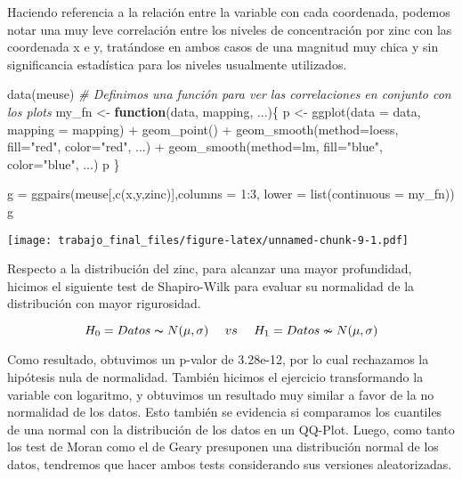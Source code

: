 \documentclass[
  12pt,
]{article}
\newenvironment{Shaded}{\begin{snugshade}}{\end{snugshade}}
\newcommand{\AttributeTok}[1]{\textcolor[rgb]{0.77,0.63,0.00}{#1}}
\newcommand{\CommentTok}[1]{\textcolor[rgb]{0.56,0.35,0.01}{\textit{#1}}}
\newcommand{\ControlFlowTok}[1]{\textcolor[rgb]{0.13,0.29,0.53}{\textbf{#1}}}
\newcommand{\DecValTok}[1]{\textcolor[rgb]{0.00,0.00,0.81}{#1}}
\newcommand{\FunctionTok}[1]{\textcolor[rgb]{0.00,0.00,0.00}{#1}}
\newcommand{\NormalTok}[1]{#1}
\newcommand{\OtherTok}[1]{\textcolor[rgb]{0.56,0.35,0.01}{#1}}
\newcommand{\SpecialCharTok}[1]{\textcolor[rgb]{0.00,0.00,0.00}{#1}}
\newcommand{\StringTok}[1]{\textcolor[rgb]{0.31,0.60,0.02}{#1}}
\begin{document}
Haciendo referencia a la relación entre la variable con cada coordenada,
podemos notar una muy leve correlación entre los niveles de
concentración por zinc con las coordenada x e y, tratándose en ambos
casos de una magnitud muy chica y sin significancia estadística para los
niveles usualmente utilizados.

\begin{Shaded}
\begin{Highlighting}[]
\FunctionTok{data}\NormalTok{(meuse)}
\CommentTok{\# Definimos una función para ver las correlaciones en conjunto con los plots}
\NormalTok{my\_fn }\OtherTok{\textless{}{-}} \ControlFlowTok{function}\NormalTok{(data, mapping, ...)\{}
\NormalTok{  p }\OtherTok{\textless{}{-}} \FunctionTok{ggplot}\NormalTok{(}\AttributeTok{data =}\NormalTok{ data, }\AttributeTok{mapping =}\NormalTok{ mapping) }\SpecialCharTok{+} 
    \FunctionTok{geom\_point}\NormalTok{() }\SpecialCharTok{+} 
    \FunctionTok{geom\_smooth}\NormalTok{(}\AttributeTok{method=}\NormalTok{loess, }\AttributeTok{fill=}\StringTok{"red"}\NormalTok{, }\AttributeTok{color=}\StringTok{"red"}\NormalTok{, ...) }\SpecialCharTok{+}
    \FunctionTok{geom\_smooth}\NormalTok{(}\AttributeTok{method=}\NormalTok{lm, }\AttributeTok{fill=}\StringTok{"blue"}\NormalTok{, }\AttributeTok{color=}\StringTok{"blue"}\NormalTok{, ...)}
\NormalTok{  p}
\NormalTok{\}}

\NormalTok{g }\OtherTok{=} \FunctionTok{ggpairs}\NormalTok{(meuse[,}\FunctionTok{c}\NormalTok{(}\StringTok{\textquotesingle{}x\textquotesingle{}}\NormalTok{,}\StringTok{\textquotesingle{}y\textquotesingle{}}\NormalTok{,}\StringTok{\textquotesingle{}zinc\textquotesingle{}}\NormalTok{)],}\AttributeTok{columns =} \DecValTok{1}\SpecialCharTok{:}\DecValTok{3}\NormalTok{, }\AttributeTok{lower =} \FunctionTok{list}\NormalTok{(}\AttributeTok{continuous =}\NormalTok{ my\_fn))}
\NormalTok{g}
\end{Highlighting}
\end{Shaded}

\texttt{[image: trabajo\_final\_files/figure-latex/unnamed-chunk-9-1.pdf]}

Respecto a la distribución del zinc, para alcanzar una mayor
profundidad, hicimos el siguiente test de Shapiro-Wilk para evaluar su
normalidad de la distribución con mayor rigurosidad.

\[H_0 = Datos \thicksim N(\mu,\sigma) ~~~~ vs ~~~~ H_1 = Datos \nsim N(\mu,\sigma) \]

Como resultado, obtuvimos un p-valor de 3.28e-12, por lo cual rechazamos
la hipótesis nula de normalidad. También hicimos el ejercicio
transformando la variable con logaritmo, y obtuvimos un resultado muy
similar a favor de la no normalidad de los datos. Esto también se
evidencia si comparamos los cuantiles de una normal con la distribución
de los datos en un QQ-Plot. Luego, como tanto los test de Moran como el
de Geary presuponen una distribución normal de los datos, tendremos que
hacer ambos tests considerando sus versiones aleatorizadas.
\end{document}
